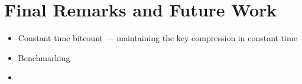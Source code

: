 
\chapter{Final Remarks and Future Work}

\begin{itemize}
    \item
    Constant time bitcount --- maintaining the key compression in constant time
    
    \item
    Benchmarking
    
    \item
    
\end{itemize}